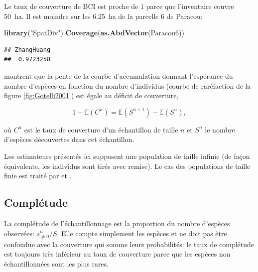 \documentclass[
  11pt,
  french,
  a4paper,
  extrafontsizes,onecolumn,openright
  ]{memoir}
\newenvironment{Shaded}{\begin{snugshade}}{\end{snugshade}}
\newcommand{\KeywordTok}[1]{\textcolor[rgb]{0.13,0.29,0.53}{\textbf{#1}}}
\newcommand{\NormalTok}[1]{#1}
\newcommand{\StringTok}[1]{\textcolor[rgb]{0.31,0.60,0.02}{#1}}
\begin{document}
\normalsize

Le taux de couverture de BCI est proche de 1 parce que l'inventaire couvre 50~ha.
Il est moindre sur les 6.25~ha de la parcelle 6 de Paracou:

\scriptsize

\begin{Shaded}
\begin{Highlighting}[]
\KeywordTok{library}\NormalTok{(}\StringTok{"SpatDiv"}\NormalTok{)}
\KeywordTok{Coverage}\NormalTok{(}\KeywordTok{as.AbdVector}\NormalTok{(Paracou6))}
\end{Highlighting}
\end{Shaded}

\begin{verbatim}
## ZhangHuang 
##  0.9723258
\end{verbatim}

\normalsize

\textcite{Chao2012b} montrent que la pente de la courbe d'accumulation donnant l'espérance du nombre d'espèces en fonction du nombre d'individus (courbe de raréfaction de la figure \ref{fig:Gotelli2001}) est égale au déficit de couverture,

\begin{equation}
  \label{eq:DefC}
  1-{\mathbb E}\left(C^{n}\right)={\mathbb E}\left(S^{n+1}\right)-{\mathbb E}\left(S^{n}\right),
\end{equation}

où \(C^{n}\) est le taux de couverture d'un échantillon de taille \(n\) et \(S^{n}\) le nombre d'espèces découvertes dans cet échantillon.

Les estimateurs présentés ici supposent une population de taille infinie (de façon équivalente, les individus sont tirés avec remise).
Le cas des populations de taille finie est traité par \textcite{Chao2012} et \textcite{Hwang2014}.

\hypertarget{compluxe9tude}{%
\subsection{Complétude}\label{compluxe9tude}}

La complétude de l'échantillonnage est la proportion du nombre d'espèces observées: \(s^{n}_{\ne 0}/{S}\).
Elle compte simplement les espèces et ne doit pas être confondue avec la couverture qui somme leurs probabilités: le taux de complétude est toujours très inférieur au taux de couverture parce que les espèces non échantillonnées sont les plus rares.
\end{document}
